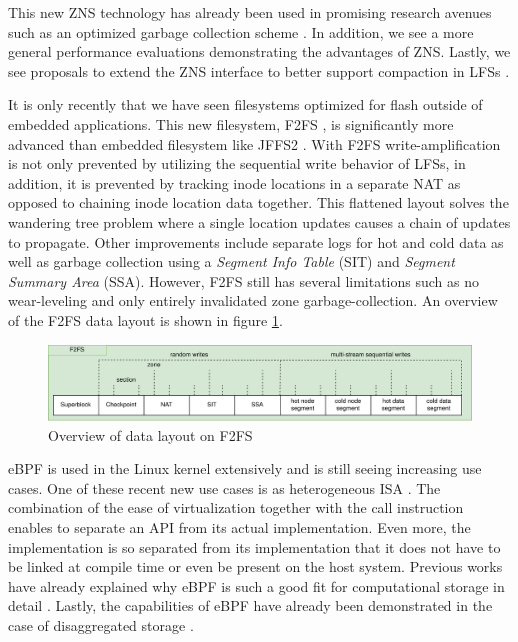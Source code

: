 This new ZNS technology has already been used in promising research avenues such
as an optimized garbage collection scheme \cite{254268}. In addition, we see
a more general performance evaluations \cite{10.1145/3458336.3465300, 9188086}
demonstrating the advantages of ZNS. Lastly, we see proposals to extend the ZNS
interface to better support compaction in LFSs \cite{273709}.


It is only recently that we have seen filesystems optimized for flash outside of
embedded applications. This new filesystem, F2FS \cite{Lee2015F2FSAN}, is
significantly more advanced than embedded filesystem like JFFS2 \cite{jffs2}.
With F2FS write-amplification is not only prevented by utilizing the sequential
write behavior of LFSs, in addition, it is prevented by tracking inode locations
in a separate NAT as opposed to chaining inode location data together. This
flattened layout solves the wandering tree problem where a single location
updates causes a chain of updates to propagate. Other improvements include
separate logs for hot and cold data as well as garbage collection using a
\textit{Segment Info Table} (SIT) and \textit{Segment Summary Area} (SSA).
However, F2FS still has several limitations such as no wear-leveling and only
entirely invalidated zone garbage-collection. An overview of the F2FS data
layout is shown in figure \ref{figure:f2fslayout}.

\begin{figure}[H]
    \centering
	\includegraphics[width=1\textwidth]{resources/images/f2fs-layout.png}
	\caption{Overview of data layout on F2FS}
    \label{figure:f2fslayout}
\end{figure}


eBPF is used in the Linux kernel extensively and is still seeing increasing use
cases. One of these recent new use cases is as heterogeneous ISA \cite{bpf-uapi}.
The combination of the ease of virtualization together with the call instruction
enables to separate an API from its actual implementation. Even more, the
implementation is so separated from its implementation that it does not have to
be linked at compile time or even be present on the host system. Previous works
have already explained why eBPF is such a good fit for computational storage in
detail \cite{ebpf_cs_2021}. Lastly, the capabilities of eBPF have already been
demonstrated in the case of disaggregated storage
\cite{kourtis2020safe, 280870}.

